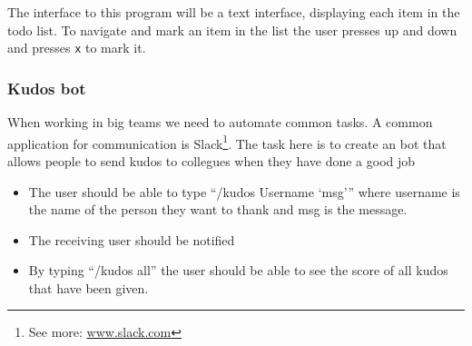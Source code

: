 The interface to this program will be a text interface, displaying each item in
the todo list. To navigate and mark an item in the list the user presses up and
down and presses \texttt{x} to mark it.

\subsubsection*{Kudos bot}

When working in big teams we need to automate common tasks. A common application
for communication is Slack\footnote{See more: \url{www.slack.com}}. The task
here is to create an bot that allows people to send kudos to collegues when they
have done a good job

\begin{itemize}
    \item The user should be able to type ``/kudos Username `msg''' where
        username is the name of the person they want to thank and msg is the
        message.
    \item The receiving user should be notified
    \item By typing ``/kudos all'' the user should be able to see the score of
        all kudos that have been given.
\end{itemize}

